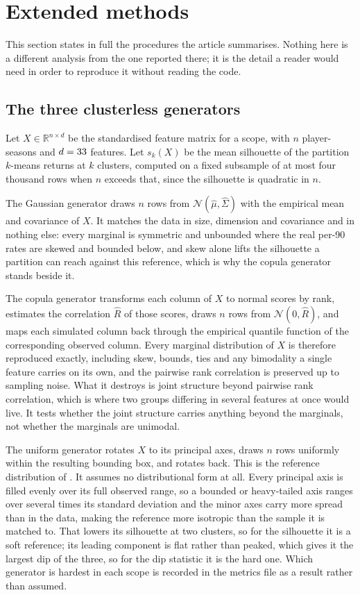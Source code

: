\section{Extended methods}
\label{sec:si:methods}

This section states in full the procedures the article summarises. Nothing here is a different
analysis from the one reported there; it is the detail a reader would need in order to reproduce
it without reading the code.

\subsection{The three clusterless generators}
\label{sec:si:generators}

Let $X \in \mathbb{R}^{n \times d}$ be the standardised feature matrix for a scope, with $n$
player-seasons and $d = 33{}$ features. Let $s_k(X)$ be the mean silhouette of the
partition $k$-means returns at $k$ clusters, computed on a fixed subsample of at most four
thousand rows when $n$ exceeds that, since the silhouette is quadratic in $n$.

The Gaussian generator draws $n$ rows from $\mathcal{N}(\hat\mu, \hat\Sigma)$ with the empirical
mean and covariance of $X$. It matches the data in size, dimension and covariance and in nothing
else: every marginal is symmetric and unbounded where the real per-90 rates are skewed and
bounded below, and skew alone lifts the silhouette a partition can reach against this reference,
which is why the copula generator stands beside it.

The copula generator transforms each column of $X$ to normal scores by rank, estimates the
correlation $\hat R$ of those scores, draws $n$ rows from $\mathcal{N}(0, \hat R)$, and maps each
simulated column back through the empirical quantile function of the corresponding observed
column. Every marginal distribution of $X$ is therefore reproduced exactly, including skew,
bounds, ties and any bimodality a single feature carries on its own, and the pairwise rank
correlation is preserved up to sampling noise. What it destroys is joint structure beyond
pairwise rank correlation, which is where two groups differing in several features at once would
live. It tests whether the joint structure carries anything beyond the marginals, not whether
the marginals are unimodal.

The uniform generator rotates $X$ to its principal axes, draws $n$ rows uniformly within the
resulting bounding box, and rotates back. This is the reference distribution of
\citet{tibshirani2001estimating}. It assumes no distributional form at all. Every principal axis
is filled evenly over its full observed range, so a bounded or heavy-tailed axis ranges over
several times its standard deviation and the minor axes carry more spread than in the data,
making the reference more isotropic than the sample it is matched to. That lowers its silhouette
at two clusters, so for the silhouette it is a soft reference; its leading component is flat
rather than peaked, which gives it the largest dip of the three, so for the dip statistic it is
the hard one. Which generator is hardest in each scope is recorded in the metrics file as a
result rather than assumed.

